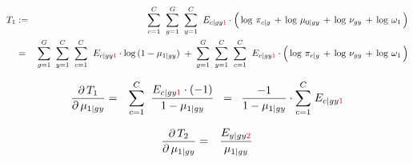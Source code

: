 \begin{eqnarray*}
T_{1}
&:=&
	\overset{C}{\underset{c=1}{\sum}}\;\;
	\overset{G}{\underset{g=1}{\sum}}\;\;
	\overset{C}{\underset{y=1}{\sum}}\;\;
	E_{c \vert gy{\color{red}1}}
	\cdot
	\left(\,
		\log\,\pi_{c \vert g}
		\,\overset{{\color{white}.}}{+}\,
		\log\,\mu_{0\vert gy}
		\,\overset{{\color{white}.}}{+}\,
		\log\,\nu_{gy}
		\,\overset{{\color{white}.}}{+}\,
		\log\,\omega_{1}
	\,\right)
\\
&=&
	\overset{G}{\underset{g=1}{\sum}}\;\;
	\overset{C}{\underset{y=1}{\sum}}\;\;
	\overset{C}{\underset{c=1}{\sum}}\;\;
	E_{c \vert gy{\color{red}1}} \cdot \log\,(1-\mu_{1\vert gy})
	\; + \;
	\overset{G}{\underset{g=1}{\sum}}\;\;
	\overset{C}{\underset{y=1}{\sum}}\;\;
	\overset{C}{\underset{c=1}{\sum}}\;\;
	E_{c \vert gy{\color{red}1}}
	\cdot
	\left(\,
		\log\,\pi_{c \vert g}
		\,\overset{{\color{white}.}}{+}\,
		\log\,\nu_{gy}
		\,\overset{{\color{white}.}}{+}\,
		\log\,\omega_{1}
	\,\right)
\end{eqnarray*}

\begin{eqnarray*}
\dfrac{\partial\,T_{1}}{\partial\,\mu_{1 \vert gy}}
&=&
	\overset{C}{\underset{c=1}{\sum}} \;\; \dfrac{E_{c \vert gy{\color{red}1}}\cdot(-1)}{1-\mu_{1\vert gy}}
	\;\; = \;\;
	\dfrac{-1}{1-\mu_{1\vert gy}} \cdot \overset{C}{\underset{c=1}{\sum}}\; E_{c \vert gy{\color{red}1}}
\end{eqnarray*}

\begin{eqnarray*}
\dfrac{\partial\,T_{2}}{\partial\,\mu_{1 \vert gy}}
&=&
	\dfrac{E_{y \vert gy{\color{red}2}}}{\mu_{1 \vert gy}}
\end{eqnarray*}

